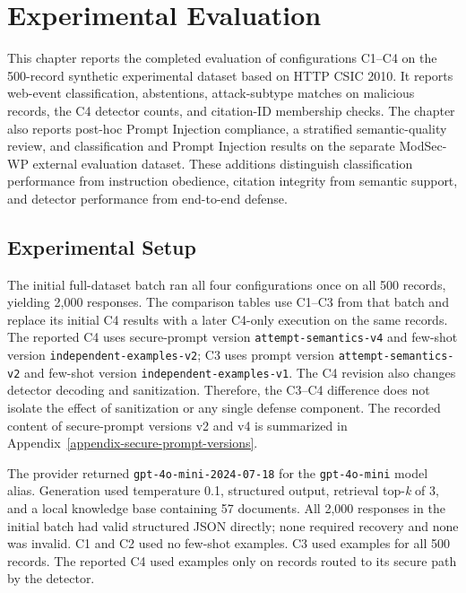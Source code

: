 \chapter{Experimental Evaluation}\label{experimental-evaluation}

This chapter reports the completed evaluation of configurations C1--C4
on the 500-record synthetic experimental dataset based on HTTP CSIC
2010. It reports web-event
classification, abstentions, attack-subtype matches on malicious
records, the C4 detector counts, and citation-ID membership checks.
The chapter also reports post-hoc Prompt Injection compliance, a
stratified semantic-quality review, and classification and Prompt
Injection results on the separate ModSec-WP external evaluation
dataset. These additions distinguish
classification performance from instruction obedience, citation
integrity from semantic support, and detector performance from
end-to-end defense.

\section{Experimental Setup}\label{experimental-setup}

The initial full-dataset batch ran all four configurations once on all 500
records, yielding 2{,}000 responses. The comparison tables use C1--C3 from
that batch and replace its initial C4 results with a later C4-only
execution on the same records. The reported C4 uses secure-prompt version
\texttt{attempt-semantics-v4} and few-shot version
\texttt{independent-examples-v2}; C3 uses prompt version
\texttt{attempt-semantics-v2} and few-shot version
\texttt{independent-examples-v1}. The C4 revision also changes detector
decoding and sanitization. Therefore, the C3--C4 difference does not
isolate the effect of sanitization or any single defense component.
The recorded content of secure-prompt versions v2 and v4 is summarized
in Appendix~\ref{appendix-secure-prompt-versions}.

The provider returned
\texttt{gpt-4o-mini-2024-07-18} for the \texttt{gpt-4o-mini} model
alias. Generation used temperature 0.1, structured output, retrieval
top-\emph{k} of 3, and a local knowledge base containing 57 documents.
All 2{,}000 responses in the initial batch had valid structured JSON
directly; none required recovery and none was invalid. C1 and C2 used no
few-shot examples. C3 used examples for all 500 records. The reported C4
used examples only on records routed to its secure path by the detector.

